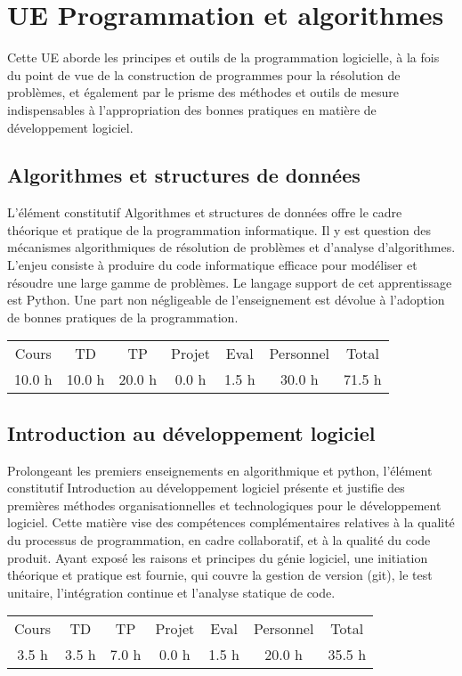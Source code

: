 \section{UE Programmation et algorithmes}%
\label{sec:UEProgrammationetalgorithmes}%
Cette UE aborde les principes et outils de la programmation logicielle, à la fois du point de vue de la construction de programmes pour la résolution de problèmes, et également par le prisme des méthodes et outils de mesure indispensables à l’appropriation des bonnes pratiques en matière de développement logiciel.%
\subsection{Algorithmes et structures de données}%
\label{subsec:Algorithmesetstructuresdedonnes}%

%
L'élément constitutif Algorithmes et structures de données offre le cadre théorique et pratique de la programmation informatique. Il y est question des mécanismes algorithmiques de résolution de problèmes et d’analyse d’algorithmes. L’enjeu consiste à produire du code informatique efficace pour modéliser et résoudre une large gamme de problèmes. Le langage support de cet apprentissage est Python. Une part non négligeable de l’enseignement est dévolue à l’adoption de bonnes pratiques de la programmation.%
\begin{longtable}{c c c c c c c}%
\hline%
Cours&TD&TP&Projet&Eval&Personnel&Total\\%
10.0 h&10.0 h&20.0 h&0.0 h&1.5 h&30.0 h&71.5 h\\%
\hline%
\end{longtable}%
\subsection{Introduction au développement logiciel}%
\label{subsec:Introductionaudveloppementlogiciel}%

%
Prolongeant les premiers enseignements en algorithmique et python, l'élément constitutif Introduction au développement logiciel présente et justifie des premières méthodes organisationnelles et technologiques pour le développement logiciel. Cette matière vise des compétences complémentaires relatives à la qualité du processus de programmation, en cadre collaboratif, et à la qualité du code produit. Ayant exposé les raisons et principes du génie logiciel, une initiation théorique et pratique est fournie, qui couvre la gestion de version (git), le test unitaire, l'intégration continue et l'analyse statique de code.%
\begin{longtable}{c c c c c c c}%
\hline%
Cours&TD&TP&Projet&Eval&Personnel&Total\\%
3.5 h&3.5 h&7.0 h&0.0 h&1.5 h&20.0 h&35.5 h\\%
\hline%
\end{longtable}%
